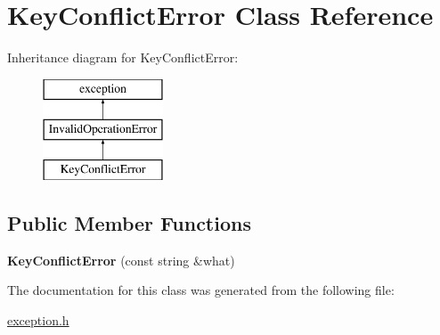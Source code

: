 \hypertarget{class_key_conflict_error}{\section{Key\-Conflict\-Error Class Reference}
\label{class_key_conflict_error}
}
Inheritance diagram for Key\-Conflict\-Error\-:\begin{figure}[H]
\begin{center}
\leavevmode
\includegraphics[height=3.000000cm]{class_key_conflict_error}
\end{center}
\end{figure}
\subsection*{Public Member Functions}
\begin{DoxyCompactItemize}
\item 
\hypertarget{class_key_conflict_error_a47c4c27e9542c637d400bf15ef8fb3f4}{{\bfseries Key\-Conflict\-Error} (const string \&what)}\label{class_key_conflict_error_a47c4c27e9542c637d400bf15ef8fb3f4}

\end{DoxyCompactItemize}


The documentation for this class was generated from the following file\-:\begin{DoxyCompactItemize}
\item 
\hyperlink{exception_8h}{exception.\-h}\end{DoxyCompactItemize}
